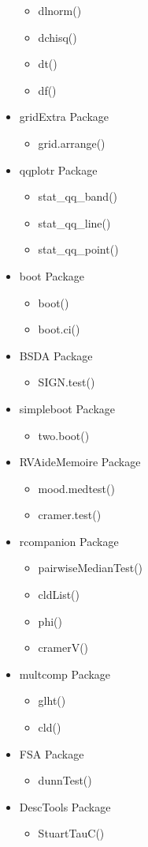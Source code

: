 \documentclass{article}
\begin{document}
\begin{multicols}{3}
\begin{itemize}
\begin{itemize}
    \item dlnorm()
    \item dchisq()
    \item dt()
    \item df()
  \end{itemize}
  \item gridExtra Package
  \begin{itemize}
  \item grid.arrange()
  \end{itemize}
  \item qqplotr Package
  \begin{itemize}
    \item stat\_qq\_band()
    \item stat\_qq\_line()
    \item stat\_qq\_point()
  \end{itemize}
  \vfill\null \columnbreak
  \item boot Package
  \begin{itemize}
  \item boot()
  \item boot.ci()
  \end{itemize}
  \item BSDA Package
  \begin{itemize}
  \item SIGN.test()
  \end{itemize}
  \item simpleboot Package
  \begin{itemize}
  \item two.boot()
  \end{itemize}
  \item RVAideMemoire Package
  \begin{itemize}
  \item mood.medtest()
  \item cramer.test()
  \end{itemize}
  \item rcompanion Package
  \begin{itemize}
  \item pairwiseMedianTest()
  \item cldList()
  \item phi()
  \item cramerV()
  \end{itemize}
  \item multcomp Package
  \begin{itemize}
  \item glht()
  \item cld()
  \end{itemize}
  \item FSA Package
  \begin{itemize}
  \item dunnTest()
  \end{itemize}
  \item DescTools Package
  \begin{itemize}
  \item StuartTauC()
  \end{itemize}
  \end{itemize}
  \vfill\null
  \end{multicols}
\end{document}
